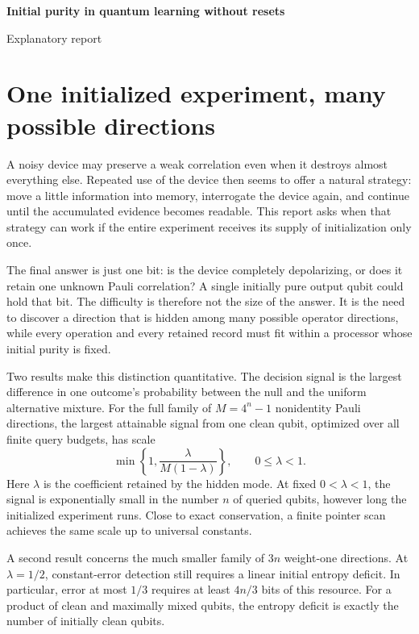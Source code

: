 \documentclass[11pt,a4paper]{article}
\numberwithin{equation}{section}
\theoremstyle{definition}
\theoremstyle{remark}
\begin{document}
\thispagestyle{plain}
\begin{center}
  {\color{ReportNavy}\LARGE\bfseries Initial purity in quantum learning without resets\par}
  \vspace{0.5em}
  {\small Explanatory report}
\end{center}
\vspace{0.25em}
\noindent{\color{ReportTeal}\rule{\textwidth}{0.6pt}}
\vspace{0.3em}

\section{One initialized experiment, many possible directions}

A noisy device may preserve a weak correlation even when it destroys almost
everything else. Repeated use of the device then seems to offer a natural
strategy: move a little information into memory, interrogate the device again,
and continue until the accumulated evidence becomes readable. This report asks
when that strategy can work if the entire experiment receives its supply of
initialization only once.

The final answer is just one bit: is the device completely depolarizing, or does
it retain one unknown Pauli correlation? A single initially pure output qubit
could hold that bit. The difficulty is therefore not the size of the answer.
It is the need to discover a direction that is hidden among many possible
operator directions, while every operation and every retained record must fit
within a processor whose initial purity is fixed.

Two results make this distinction quantitative. The decision signal is the
largest difference in one outcome's probability between the null and the
uniform alternative mixture. For the full family of $M=4^n-1$ nonidentity
Pauli directions, the largest attainable signal from one clean qubit,
optimized over all finite query budgets, has scale
\[
 \min\left\{1,\frac{\lambda}{M(1-\lambda)}\right\},
 \qquad 0\leq\lambda<1.
\]
Here $\lambda$ is the coefficient retained by the hidden mode. At fixed
$0<\lambda<1$, the signal is exponentially small in the number $n$ of queried
qubits, however long the initialized experiment runs. Close to exact
conservation, a finite pointer scan achieves the same scale up to universal
constants.

A second result concerns the much smaller family of $3n$ weight-one directions.
At $\lambda=1/2$, constant-error detection still requires a linear initial
entropy deficit. In particular, error at most $1/3$ requires at least $4n/3$
bits of this resource. For a product of clean and maximally mixed qubits, the
entropy deficit is exactly the number of initially clean qubits.
\end{document}
